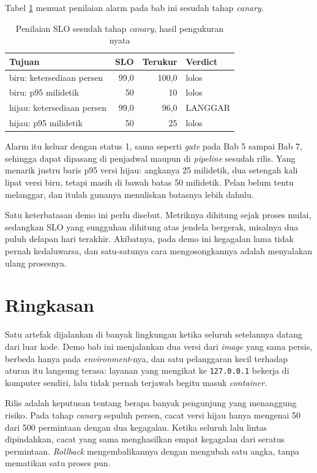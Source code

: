 Tabel \ref{tab:slo} memuat penilaian alarm pada bab ini sesudah tahap
\textit{canary}.

\begin{table}[!htb]
  \centering
  \caption{Penilaian SLO sesudah tahap \textit{canary}, hasil pengukuran
           nyata}
  \label{tab:slo}
  \begin{tabularx}{\textwidth}{Xrrl}
    \hline
    \textbf{Tujuan} & \textbf{SLO} & \textbf{Terukur} & \textbf{Verdict} \\
    \hline
    biru: ketersediaan persen & 99,0 & 100,0 & lolos \\
    \hline
    biru: p95 milidetik & 50 & 10 & lolos \\
    \hline
    hijau: ketersediaan persen & 99,0 & 96,0 & LANGGAR \\
    \hline
    hijau: p95 milidetik & 50 & 25 & lolos \\
    \hline
  \end{tabularx}
\end{table}

Alarm itu keluar dengan status 1, sama seperti \textit{gate} pada Bab 5 sampai Bab
7, sehingga dapat dipasang di penjadwal maupun di \textit{pipeline} sesudah
rilis. Yang menarik justru baris p95 versi hijau: angkanya 25 milidetik, dua
setengah kali lipat versi biru, tetapi masih di bawah batas 50 milidetik.
Pelan belum tentu melanggar, dan itulah gunanya menuliskan batasnya lebih
dahulu.

Satu keterbatasan demo ini perlu disebut. Metriknya dihitung sejak proses
mulai, sedangkan SLO yang sungguhan dihitung atas jendela bergerak, misalnya
dua puluh delapan hari terakhir. Akibatnya, pada demo ini kegagalan lama
tidak pernah kedaluwarsa, dan satu-satunya cara mengosongkannya adalah
menyalakan ulang prosesnya.

\section{Ringkasan}

Satu artefak dijalankan di banyak lingkungan ketika seluruh setelannya datang
dari luar kode. Demo bab ini menjalankan dua versi dari \textit{image} yang
sama persis, berbeda hanya pada \textit{environment}-nya, dan satu
pelanggaran kecil terhadap aturan itu langsung terasa: layanan yang mengikat
ke \texttt{127.0.0.1} bekerja di komputer sendiri, lalu tidak pernah terjawab
begitu masuk \textit{container}.

Rilis adalah keputusan tentang berapa banyak pengunjung yang menanggung
risiko. Pada tahap \textit{canary} sepuluh persen, cacat versi hijau hanya
mengenai 50 dari 500 permintaan dengan dua kegagalan. Ketika seluruh lalu
lintas dipindahkan, cacat yang sama menghasilkan empat kegagalan dari seratus
permintaan. \textit{Rollback} mengembalikannya dengan mengubah satu angka,
tanpa mematikan satu proses pun.

